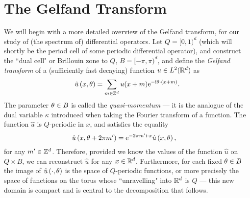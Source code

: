 \section{The Gelfand Transform} \label{sec:TP-GelfandTransform}
We will begin with a more detailed overview of the Gelfand transform, for our study of (the spectrum of) differential operators.
Let $Q=[0,1)^d$ (which will shortly be the period cell of some periodic differential operator), and construct the ``dual cell" or Brillouin zone to $Q$, $B=[-\pi,\pi)^d$, and define the \emph{Gelfand transform} of a (sufficiently fast decaying) function $u\in L^2(\mathbb{R}^d)$ as  
\begin{align*}
	\hat{u}\left( x,\theta \right) = \sum_{m\in\mathbb{Z}^d}u(x+m)\mathrm{e}^{-\mathrm{i}\theta\cdot(x+m)}.
\end{align*}
The parameter $\theta\in B$ is called the \emph{quasi-momentum} --- it is the analogue of the dual variable $\kappa$ introduced when taking the Fourier transform of a function.
The function $\hat{u}$ is $Q$-periodic in $x$, and satisfies the equality
\begin{align} \label{eq:GelfandTransform}
	\hat{u}\left( x,\theta+2\pi m' \right) &= \mathrm{e}^{-2\pi m'\mathrm{i}\cdot x}\hat{u}\left( x,\theta \right),
\end{align}
for any $m'\in\mathbb{Z}^d$.
Therefore, provided we know the values of the function $\hat{u}$ on $Q\times B$, we can reconstruct $\hat{u}$ for any $x\in\mathbb{R}^d$.
Furthermore, for each fixed $\theta\in B$ the image of $\hat{u}\left( \cdot,\theta \right)$ is the space of $Q$-periodic functions, or more precisely the space of functions on the torus whose ``unravelling"  into $\mathbb{R}^d$ is $Q$ --- this new domain is compact and is central to the decomposition that follows.


